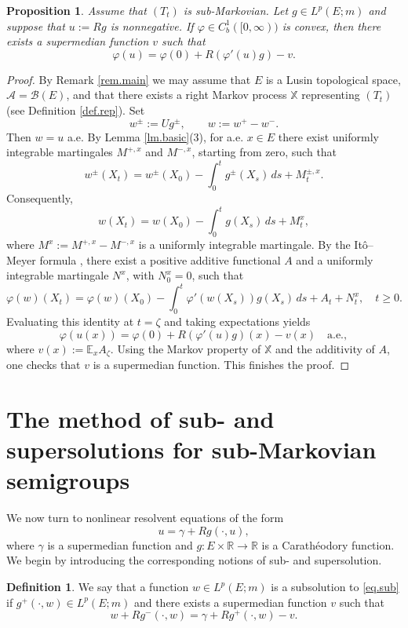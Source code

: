 \documentclass[11pt,a4paper,reqno]{amsart}
\newtheorem{proposition}[theorem]{\bf Proposition}
\theoremstyle{definition}
\newtheorem{definition}[theorem]{Definition}
\numberwithin{equation}{section}
\begin{document}
\begin{proposition}
\label{prop.if1}
Assume that $(T_t)$ is sub-Markovian. Let $g\in L^p(E;m)$ and suppose that $u:=Rg$ is nonnegative.
If $\varphi\in C^1_b([0,\infty))$ is convex, then there exists a
supermedian function $v$ such that
\[
\varphi(u)
=
\varphi(0)+R(\varphi'(u)g)-v.
\]
\end{proposition}
\begin{proof}
By Remark \ref{rem.main} we may assume that $E$ is a Lusin
topological space, $\mathcal A=\mathcal B(E)$, and that there exists
a right Markov process $\mathbb X$ representing $(T_t)$ (see Definition \ref{def.rep}).
Set
\[
w^\pm:=Ug^\pm,
\qquad
w:=w^+-w^-.
\]
Then $w=u$ a.e. By Lemma \ref{lm.basic}(3), for a.e. $x\in E$ there
exist uniformly integrable martingales $M^{+,x}$ and $M^{-,x}$,
starting from zero, such that
\[
w^\pm(X_t)
=
w^\pm(X_0)
-
\int_0^t g^\pm(X_s)\,ds
+
M_t^{\pm,x}.
\]
Consequently,
\[
w(X_t)
=
w(X_0)
-
\int_0^t g(X_s)\,ds
+
M_t^x,
\]
where $M^x:=M^{+,x}-M^{-,x}$ is a uniformly integrable martingale.
By the It\^o--Meyer formula \cite[Theorem IV.70]{Protter}, there exist a positive additive
functional $A$ and a uniformly integrable martingale $N^x$, with
$N_0^x=0$, such that
\[
\varphi(w)(X_t)
=
\varphi(w)(X_0)
-
\int_0^t
\varphi'(w(X_s))g(X_s)\,ds
+
A_t+N_t^x,\quad t\ge 0.
\]
Evaluating this identity at $t=\zeta$ and taking expectations yields
\[
\varphi(u(x))
=
\varphi(0)
+
R(\varphi'(u)g)(x)
-
v(x)
\quad\text{a.e.},
\]
where $v(x):=\mathbb E_xA_\zeta$. 
Using the Markov property of $\mathbb X$ and the additivity of $A$, one checks that
$v$ is a supermedian function. This finishes the proof.  
\end{proof}

\section{The method of sub- and supersolutions for sub-Markovian semigroups}
\label{sec5}
We now turn to nonlinear resolvent equations of the form
\begin{equation}
\label{eq.sub}
u=\gamma+Rg(\cdot,u),
\end{equation}
where $\gamma$ is a supermedian function and
$g:E\times\mathbb R\to\mathbb R$ is a Carath\'eodory function. 
We begin by introducing the corresponding notions of sub- and supersolution.

\begin{definition}
We say that a  function $w\in L^p(E;m)$ is a subsolution to
\eqref{eq.sub}
if $g^+(\cdot,w)\in L^p(E;m)$ and there exists a supermedian function $v$
such that
\[
w+Rg^-(\cdot,w)=\gamma+Rg^+(\cdot,w)-v.
\]
\end{definition}
\end{document}
